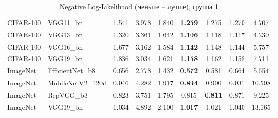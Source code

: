 \begin{table}[h!]
{\begin{tabular}{llccccccc}
CIFAR-100 &          VGG11\_bn &         1.541 &        3.978 &    1.840 & \textbf{1.259} &                  1.275 &                  1.270 &                  4.707 \\
CIFAR-100 &          VGG13\_bn &         1.320 &        3.361 &    1.642 & \textbf{1.106} &                  1.118 &                  1.117 &                  4.230 \\
CIFAR-100 &          VGG16\_bn &         1.677 &        3.162 &    1.584 & \textbf{1.142} &                  1.148 &                  1.144 &                  5.757 \\
CIFAR-100 &          VGG19\_bn &         1.836 &        3.034 &    1.621 & \textbf{1.158} &                  1.162 &                  1.158 &                  7.711 \\
 ImageNet &   EfficientNet\_b8 &         0.656 &        2.778 &    1.432 & \textbf{0.572} &                  0.581 &                  0.664 &                  5.554 \\
 ImageNet &  MobileNetV2\_120d &         0.946 &        4.282 &    1.917 & \textbf{0.894} &                  0.900 &                  0.931 &                 10.508 \\
 ImageNet &         RepVGG\_b3 &         0.823 &        3.751 &    1.795 &                  0.815 & \textbf{0.811} &                  0.871 &                  9.225 \\
 ImageNet &          VGG19\_bn &         1.034 &        4.892 &    2.100 & \textbf{1.017} &                  1.021 &                  1.040 &                 13.665 \\
\bottomrule
\end{tabular}%
}
\caption{Negative Log-Likelihood (меньше -- лучше), группа 1}
\label{tab:metrics:NLL_1}
\end{table}
